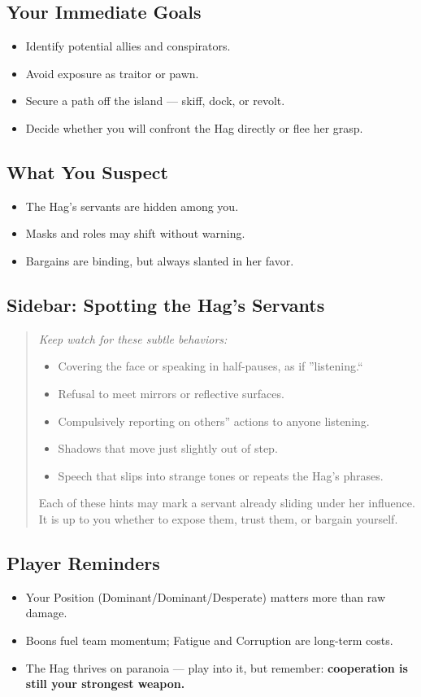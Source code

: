\documentclass[11pt]{article}
\newenvironment{callout}
{\begin{quote}\itshape\small\color{gray!40!black}}
{\end{quote}}
\begin{document}
\subsection{Your Immediate Goals}
\begin{itemize}
  \item Identify potential allies and conspirators.
  \item Avoid exposure as traitor or pawn.
  \item Secure a path off the island --- skiff, dock, or revolt.
  \item Decide whether you will confront the Hag directly or flee her grasp.
\end{itemize}

\subsection{What You Suspect}
\begin{itemize}
  \item The Hag's servants are hidden among you.  
  \item Masks and roles may shift without warning.  
  \item Bargains are binding, but always slanted in her favor.  
\end{itemize}

\subsection*{Sidebar: Spotting the Hag's Servants}
\begin{callout}{Tells in Plain Sight}
Keep watch for these subtle behaviors:
\begin{itemize}
  \item Covering the face or speaking in half-pauses, as if ''listening.``  
  \item Refusal to meet mirrors or reflective surfaces.  
  \item Compulsively reporting on others'' actions to anyone listening.  
  \item Shadows that move just slightly out of step.  
  \item Speech that slips into strange tones or repeats the Hag's phrases.  
\end{itemize}
Each of these hints may mark a servant already sliding under her influence.  
It is up to you whether to expose them, trust them, or bargain yourself.
\end{callout}

\subsection{Player Reminders}
\begin{itemize}
  \item Your Position (Dominant/Dominant/Desperate) matters more than raw damage.  
  \item Boons fuel team momentum; Fatigue and Corruption are long-term costs.  
  \item The Hag thrives on paranoia --- play into it, but remember: \textbf{cooperation is still your strongest weapon.}  
\end{itemize}
\end{document}
